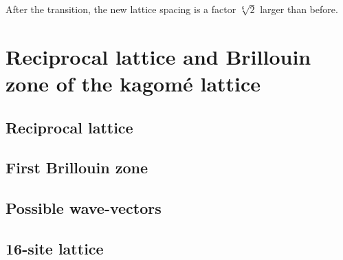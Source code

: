\documentclass[11pt, english, fleqn, DIV=15, headinclude, BCOR=1cm]{scrartcl}
\begin{document}
After the transition, the new lattice spacing is a factor $\sqrt[6] 2$ larger
than before.

\section{Reciprocal lattice and Brillouin zone of the kagomé lattice}
\label{homework:2}

\subsection{Reciprocal lattice}

\subsection{First Brillouin zone}

\subsection{Possible wave-vectors}

\subsection{16-site lattice}
\end{document}
